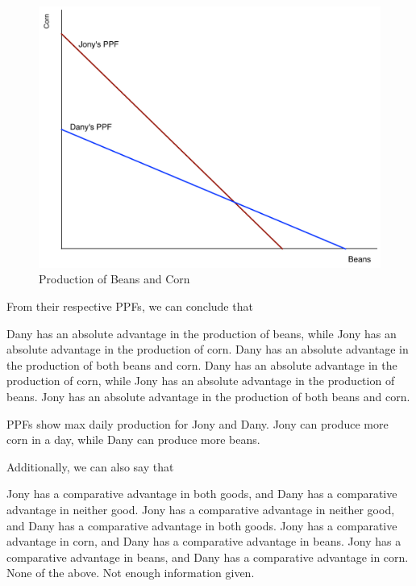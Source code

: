 \documentclass[addpoints,11pt]{exam}
\theoremstyle{definition}
\begin{document}
\begin{questions}
		\begin{figure}[H]
			\centering
			\includegraphics[scale=.4]{Final_MC18.pdf}
			\caption{Production of Beans and Corn}
			\label{MC18}
		\end{figure}
		

			
			\question \label{blah3} From their respective PPFs, we can conclude that
			
			\begin{choices}
				\CorrectChoice Dany has an absolute advantage in the production of beans, while Jony has an absolute advantage in the production of corn.
				\choice Dany has an absolute advantage in the production of both beans and corn.
				\choice Dany has an absolute advantage in the production of corn, while Jony has an absolute advantage in the production of beans.
				\choice Jony has an absolute advantage in the production of both beans and corn.
			\end{choices}
			
			\begin{solution}
				PPFs show max daily production for Jony and Dany. Jony can produce more corn in a day, while Dany can produce more beans.
			\end{solution}
			
			\question \label{blah4} Additionally, we can also say that 
			
			\begin{choices}
				\choice Jony has a comparative advantage in both goods, and Dany has a comparative advantage in neither good.
				\choice Jony has a comparative advantage in neither good, and Dany has a comparative advantage in both goods.
				\CorrectChoice Jony has a comparative advantage in corn, and Dany has a comparative advantage in beans.
				\choice Jony has a comparative advantage in beans, and Dany has a comparative advantage in corn.
				\choice None of the above. Not enough information given.
			\end{choices}
			

\end{questions}
\end{document}
